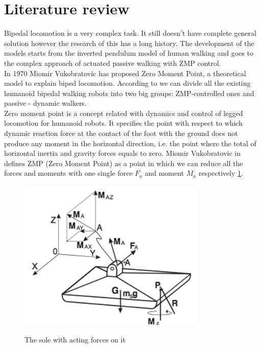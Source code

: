 \documentclass[11pt,a4paper]{article}
\begin{document}
\section{Literature review}
Bipedal locomotion is a very complex task. It still doesn't have complete general solution however the research of this has a long history. The development of the models starts from the inverted pendulum model of human walking and goes to the complex approach of actuated passive walking with ZMP control.\\
In 1970 Miomir Vukobratovic has proposed Zero Moment Point, a theoretical model to explain biped locomotion.
According to \cite{manchester2011stable} we can divide all the existing humanoid bipedal walking robots into two big groups: ZMP-controlled ones and passive - dynamic walkers.\\
Zero moment point is a concept related with dynamics and control of legged locomotion for humanoid robots. It specifies the point with respect to which dynamic reaction force at the contact of the foot with the ground does not produce any moment in the horizontal direction, i.e. the point where the total of horizontal inertia and gravity forces equals to zero.
Miomir Vukobratovic in \cite{vukobratovic2004zero} defines ZMP (Zero Moment Point) as a point in which we can reduce all the forces and moments with one single force $F_a$ and moment $M_a$ respectively  \cref{fig:1}.
	
	\begin{figure}[h!]
		\vspace{-0.2cm}
		\centering
		{\includegraphics[width=0.8\textwidth]{1}}
		\caption{The sole with acting forces on it}
		\label{fig:1}
		\vspace{-0.1cm}
	\end{figure}
\end{document}
